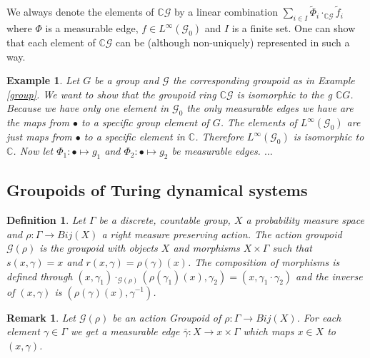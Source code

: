 \documentclass[12pt,a4paper]{scrartcl}
\newtheorem{Definition}[Theorem]{Definition}
\newtheorem{Example}[Theorem]{Example}
\newtheorem{Remark}[Theorem]{Remark}
\numberwithin{equation}{section}
\newcommand{\C}{\mathbb{C}} %
\newcommand{\2}{\mathbb{Z} / 2 \mathbb{Z}}
\newcommand{\G}{\mathcal{G}}
\newcommand{\1}{\bar{1}}
\newcommand{\0}{\bar{0}}
\begin{document}
We always denote the elements of $\C\G$ by a linear combination $\sum_{i \in I} \tilde \Phi_i \cdot_{\C \G} \tilde f_i$ where $\Phi$ is a measurable edge, $f \in L^\infty(\G_0)$ and $I$ is a finite set. One can show that each element of $\C \G$ can be (although non-uniquely) represented in such a way. 
\begin{Example}
	Let $G$ be a group and $\G$ the corresponding groupoid as in Example \ref{group}. We want to show that the groupoid ring $\C \G$ is isomorphic to the g $\C G$. Because we have only one element in $\G_0$ the only measurable edges we have are the maps from $\bullet$ to a specific group element of $G$. The elements of $L^\infty(\G_0)$ are just maps from $\bullet$ to a specific element in $\C$. Therefore  $L^\infty(\G_0)$ is isomorphic to $\C$. Now let $\Phi_1: \bullet \mapsto g_1$ and $\Phi_2: \bullet \mapsto g_2$ be measurable edges. $\ldots$
\end{Example}


\subsection{Groupoids of Turing dynamical systems}
\begin{Definition}
	Let $\Gamma$ be a discrete, countable group, $X$ a probability measure space and $\rho: \Gamma \to Bij(X)$ a right measure preserving action. The action groupoid $\G(\rho)$ is the groupoid with objects $X$ and morphisms $X \times \Gamma$ such that $s(x,\gamma) = x$ and $r(x, \gamma) = \rho(\gamma) (x)$. The composition of morphisms is defined through $(x, \gamma_1) \cdot_{\G(\rho)} (\rho(\gamma_1) (x), \gamma_2) = (x, \gamma_1 \cdot \gamma_2)$ and the inverse of $(x, \gamma)$ is $(\rho(\gamma) (x), \gamma^{-1})$.
\end{Definition}

\begin{Remark}
	Let $\G(\rho)$ be an action Groupoid of $\rho: \Gamma \to Bij(X)$. For each element $\gamma \in \Gamma$ we get a measurable edge $\bar{\gamma}: X \to x \times \Gamma$ which maps $x \in X$ to $(x, \gamma)$.
\end{Remark}
\end{document}
